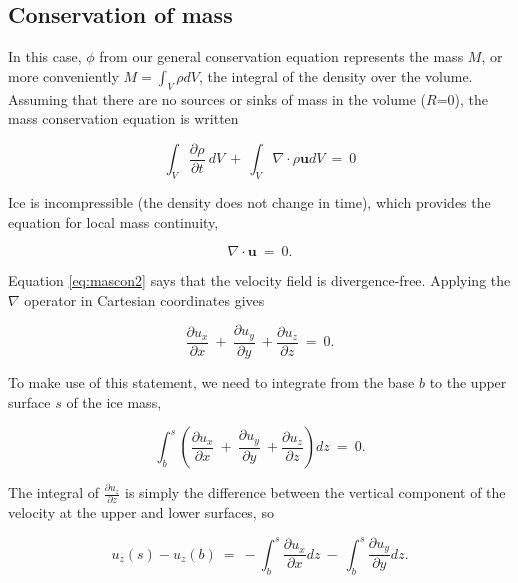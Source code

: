 \subsection{Conservation of mass}

In this case, $\phi$ from our general conservation equation represents the mass $M$, or more conveniently
$M = \int_V \rho dV$, the integral of the density over the volume. Assuming that there are no sources or 
sinks of mass in the volume ($R$=0), the mass conservation equation is written

\begin{equation}
\int_{V}\frac{\partial \rho} {\partial t} ~dV ~+~ \int_{V} \nabla \cdot \rho \mathbf{u} dV~=~0
\label{eq:mascon1}
\end{equation}

\noindent
Ice is incompressible (the density does not change in time), which provides the equation for 
local mass continuity,

\begin{equation}
\nabla \cdot \mathbf{u} ~=~0.
\label{eq:mascon2}
\end{equation}

\noindent
Equation \eqref{eq:mascon2} says that the velocity field is divergence-free. Applying the $\nabla$ 
operator in Cartesian coordinates gives

\begin{equation}
\frac{\partial u_{x}}{\partial x}~+~\frac{\partial u_{y}}{\partial y} ~+\frac{\partial u_{z}}{\partial z}~=~0.  
\label{eq:mascon3}
\end{equation}

\noindent
To make use of this statement, we need to integrate from the base $b$ to the upper surface $s$ of the ice mass,

\begin{equation}
\int_{b}^{s} \left( \frac{\partial u_{x}}{\partial x}~+~\frac{\partial u_{y}}{\partial y} ~+\frac{\partial u_{z}}{\partial z}\right) dz~=~0.  
\label{eq:mascon4}
\end{equation}

\noindent
The integral of $\frac{\partial u_z}{\partial z}$ is simply the difference between
the vertical component of the velocity at the upper and lower surfaces, so

\begin{equation}
u_{z} \left(s\right)-u_{z} \left(b\right)~=~-\int_{b}^{s} \frac{\partial u_{x}}{\partial x} dz ~-~\int_{b}^{s} \frac{\partial u_{y}}{\partial y} dz.  
\label{eq:mascon5}
\end{equation}

